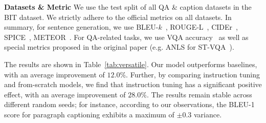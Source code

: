 \noindent\textbf{Datasets \& Metric}
We use the test split of all QA \& caption datasets in the BIT dataset. We strictly adhere to the official metrics on all datasets. In summary, for sentence generation, we use BLEU-$k$~\cite{papineni2002bleu}, ROUGE-L~\cite{lin2004rouge}, CIDEr~\cite{vedantam2015cider}, SPICE~\cite{anderson2016spice}, METEOR~\cite{banerjee2005meteor}. For QA-related tasks, we use VQA accuracy~\cite{antol2015vqa} as well as special metrics proposed in the original paper (e.g. ANLS for ST-VQA~\cite{biten2019scene}).

The results are shown in Table~\ref{tab:versatile}. Our model outperforms baselines, with an average improvement of $12.0\%$. Further, by comparing instruction tuning and from-scratch models, we find that instruction tuning has a significant positive effect, with an average improvement of $28.0\%$. The results remain stable across different random seeds; for instance, according to our observations, the BLEU-1 score for paragraph captioning exhibits a maximum of $\pm 0.3$ variance.

\begingroup
{}
\begin{table}[htbp]
\vspace{-1.5em}
    \caption{Model adaptation to new tasks. \textit{sentiment understanding} and \textit{utility/affordance} are sub-datasets from TDIUC that are particularly relevant to BCI applications.}
    \label{tab:new_task}
\vskip 0.1in
    \centering
    \vspace{-1em}
\end{table}
\endgroup


